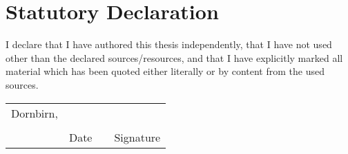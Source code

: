
\thispagestyle{empty}
\section*{Statutory Declaration}
I declare that I have authored this thesis independently, that I have
not used other than the declared sources/resources, and that I have
explicitly marked all material which has been quoted either literally
or by content from the used sources.

\vfill

\newcommand{\mysignatureblock}[3]{%
  \begin{tabular}{llp{2em}l}
  #1 & \hspace{4cm}        & & \hspace{5cm} \\\cline{2-2}\cline{4-4}
     &                     & & \\[-3mm]
     & {\footnotesize #2}  & & {\footnotesize #3}
  \end{tabular}
}

\mysignatureblock{Dornbirn,}{Date}{Signature}

\vfill\vfill

\newpage

